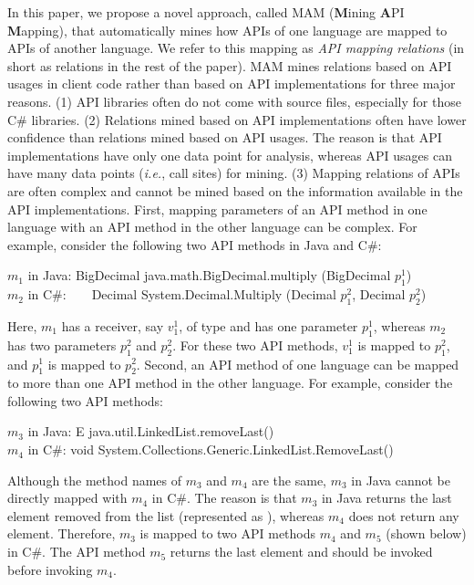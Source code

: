 In this paper, we propose a novel approach, called MAM
(\textbf{M}ining \textbf{A}PI \textbf{M}apping), that automatically mines
how APIs of one language are mapped to APIs of another language. We
refer to this mapping as \emph{API mapping relations}
(in short as relations in the rest of the paper). MAM mines relations based on API usages in
client code rather than based on API implementations for three major
reasons. (1) API libraries often do not come with source files,
especially for those C\# libraries. (2) Relations mined based on API
implementations often have lower confidence than relations mined
based on API usages. The reason is that API implementations have
only one data point for analysis, whereas API usages can have many
data points (\emph{i.e.}, call sites) for mining. (3) Mapping relations of
APIs are often complex and cannot be mined based on the information
available in the API implementations. First, mapping parameters of
an API method in one language with an API method in the other
language can be complex. For example, consider the following two API
methods in Java and C\#:

\begin{CodeOut}
$m_1$ in Java: BigDecimal java.math.BigDecimal.multiply (BigDecimal $p_1^1$)\\
\hspace*{0.12in}$m_2$ in C\#:\ \ \ \  Decimal
System.Decimal.Multiply (Decimal $p_1^2$, Decimal $p_2^2$)
\end{CodeOut}

Here, $m_1$ has a receiver, say $v_1^1$, of type 
and has one parameter $p_1^1$, whereas $m_2$ has two parameters $p_1^2$
and $p_2^2$. For these two API methods, $v_1^1$ is
mapped to $p_1^2$, and $p_1^1$ is mapped to $p_2^2$. Second, an API
method of one language can be mapped to more than one API method in the
other language. For example, consider the following two API methods:

\begin{CodeOut}
$m_3$ in Java: E java.util.LinkedList.removeLast()\\
\hspace*{0.12in}$m_4$ in C\#: void System.Collections.Generic.LinkedList.RemoveLast()
\end{CodeOut}

Although the method names of $m_3$ and $m_4$ are the same, $m_3$ in Java
cannot be directly mapped with $m_4$ in C\#. The reason is that $m_3$ in Java
returns the last element removed from the list (represented as ), whereas $m_4$ does not return any
element. Therefore, $m_3$ is mapped to two API methods $m_4$ and $m_5$ (shown below) in C\#.
The API method $m_5$ returns the last element and should be invoked before invoking $m_4$.

